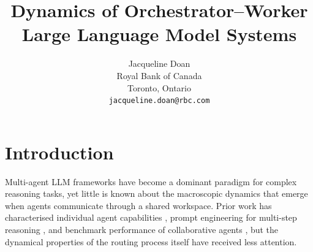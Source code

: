 \documentclass{article}
\title{Dynamics of Orchestrator--Worker Large Language Model Systems}
\author{%
  Jacqueline Doan \\
  Royal Bank of Canada \\
  Toronto, Ontario \\
  \texttt{jacqueline.doan@rbc.com}
}
\begin{document}
\maketitle

\begin{abstract}
\end{abstract}

\section{Introduction}

Multi-agent LLM frameworks have become a dominant paradigm for complex
reasoning tasks, yet little is known about the macroscopic dynamics that
emerge when agents communicate through a shared workspace.
Prior work has characterised individual agent capabilities
\citep{CITE_singleagent}, prompt engineering for multi-step
reasoning \citep{CITE_chainofthought}, and benchmark performance of
collaborative agents \citep{CITE_multiagentbench}, but the dynamical
properties of the routing process itself have received less attention.
\end{document}
